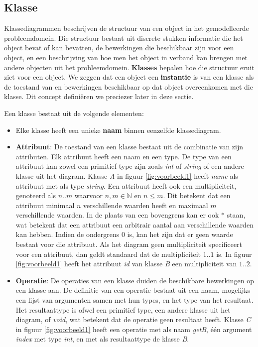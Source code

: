 \subsection{Klasse}

Klassediagrammen beschrijven de structuur van een object in het gemodelleerde probleemdomein. Die structuur bestaat uit discrete stukken informatie die het object bevat of kan bevatten, de bewerkingen die beschikbaar zijn voor een object, en een beschrijving van hoe men het object in verband kan brengen met andere objecten uit het probleemdomein. \textbf{Klasses} bepalen hoe die structuur eruit ziet voor een object. We zeggen dat een object een \textbf{instantie} is van een klasse als de toestand van en bewerkingen beschikbaar op dat object overeenkomen met die klasse. Dit concept defini\"eren we preciezer later in deze sectie.

Een klasse bestaat uit de volgende elementen:

\begin{itemize}
	\item Elke klasse heeft een unieke \textbf{naam} binnen eenzelfde klassediagram.
	\item \textbf{Attribuut}: De toestand van een klasse bestaat uit de combinatie van zijn attributen. Elk attribuut heeft een naam en een type. De type van een attribuut kan zowel een primitief type zijn zoals \textit{int} of \textit{string} of een andere klasse uit het diagram. Klasse \textit{A} in figuur \ref{fig:voorbeeld1} heeft \textit{name} als attribuut met als type \textit{string}. Een attribuut heeft ook een multipliciteit, genoteerd als $n..m$ waarvoor $n,m \in \mathbb{N}$ en $n \leq m$. Dit betekent dat een attribuut minimaal $n$ verschillende waarden heeft en maximaal $m$ verschillende waarden. In de plaats van een bovengrens kan er ook $*$ staan, wat betekent dat een attribuut een arbitrair aantal aan verschillende waarden kan hebben. Indien de ondergrens 0 is, kan het zijn dat er geen waarde bestaat voor die attribuut. Als het diagram geen multipliciteit specificeert voor een attribuut, dan geldt standaard dat de multipliciteit $1..1$ is. In figuur \ref{fig:voorbeeld1} heeft het attribuut \textit{id} van klasse \textit{B} een multipliciteit van $1..2$.
	\item \textbf{Operatie}: De operaties van een klasse duiden de beschikbare bewerkingen op een klasse aan. De definitie van een operatie bestaat uit een naam, mogelijks een lijst van argumenten samen met hun types, en het type van het resultaat. Het resultaattype is ofwel een primitief type, een andere klasse uit het diagram, of \textit{void}, wat betekent dat de operatie geen resultaat heeft. Klasse \textit{C} in figuur \ref{fig:voorbeeld1} heeft een operatie met als naam \textit{getB}, \'e\'en argument \textit{index} met type \textit{int}, en met als resultaattype de klasse \textit{B}.
\end{itemize}

